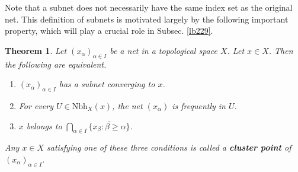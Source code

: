 \documentclass[12pt,b5paper,notitlepage]{article}
\theoremstyle{definition}
\theoremstyle{plain}
\newtheorem{thm}[df]{Theorem}
\newcommand{\ovl}{\overline}
\newcommand{\dps}{\displaystyle}
\newcommand{\Nbh}{\mathrm{Nbh}}
\numberwithin{equation}{section}
\begin{document}
Note that a subnet does not necessarily have the same index set as the original net. This definition of subnets is motivated largely by the following important property, which will play a crucial role in Subsec. \ref{lb229}.

\begin{thm}\label{lb213}
Let $(x_\alpha)_{\alpha\in I}$ be a net in a topological space $X$. Let $x\in X$. Then the following are equivalent.
\begin{enumerate}[label=(\arabic*)]
\item $(x_\alpha)_{\alpha\in I}$ has a subnet converging to $x$.
\item For every $U\in\Nbh_X(x)$, the net $(x_\alpha)$ is frequently in $U$.
\item $x$ belongs to $\dps\bigcap_{\alpha\in I}\ovl{\{x_\beta:\beta\geq\alpha\}}$.
\end{enumerate}
Any $x\in X$ satisfying one of these three conditions is called a \textbf{cluster point}  of $(x_\alpha)_{\alpha\in I}$.
\end{thm}
\end{document}
